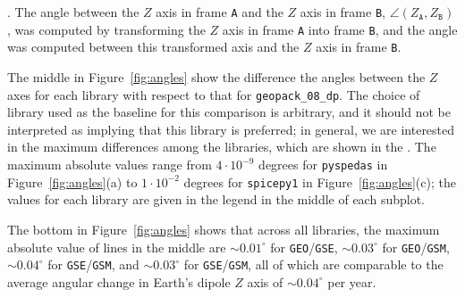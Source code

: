 \documentclass[draft]{agujournal2019}
\begin{document}
 . The angle between the $Z$ axis in frame \texttt{A} and the $Z$ axis in frame \texttt{B}, $\angle (Z_\mathtt{A}, Z_\mathtt{B})$, was computed by transforming the $Z$ axis in frame \texttt{A} into frame \texttt{B}, and the angle was computed between this transformed axis and the $Z$ axis in frame \texttt{B}. 

The middle  in Figure~\ref{fig:angles} show the difference  the angles between the $Z$ axes for each library with respect to that for \texttt{geopack\_08\_dp}. The choice of library used as the baseline for this comparison is arbitrary, and it should not be interpreted as implying that this library is preferred; in general, we are interested in the maximum differences among the libraries, which are shown in the   . The maximum absolute values  range from $4\cdot 10^{-9}$ degrees for \texttt{pyspedas} in Figure~\mbox{\ref{fig:angles}}(a) to $1\cdot 10^{-2}$ degrees for \texttt{spicepy1} in Figure~\mbox{\ref{fig:angles}}(c); the values for each library are given in the legend in the middle  of each subplot. 

The bottom  in Figure~\ref{fig:angles} shows that across all libraries, the maximum absolute value of lines in the middle  are ${\sim}0.01^\circ$ for \texttt{GEO}/\texttt{GSE}, ${\sim} 0.03^\circ$ for \texttt{GEO}/\texttt{GSM}, ${\sim}0.04^\circ$ for \texttt{GSE}/\texttt{GSM}, and ${\sim}0.03^\circ$ for \texttt{GSE}/\texttt{GSM}, all of which are comparable to the average angular change in Earth's dipole $Z$ axis of ${\sim}0.04^\circ$ per year.
\end{document}
